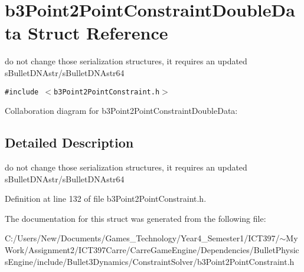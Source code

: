 \hypertarget{structb3_point2_point_constraint_double_data}{
\section{b3Point2PointConstraintDoubleData Struct Reference}
\label{structb3_point2_point_constraint_double_data}
}
do not change those serialization structures, it requires an updated sBulletDNAstr/sBulletDNAstr64  


{\tt \#include $<$b3Point2PointConstraint.h$>$}

Collaboration diagram for b3Point2PointConstraintDoubleData:

\subsection{Detailed Description}
do not change those serialization structures, it requires an updated sBulletDNAstr/sBulletDNAstr64 

Definition at line 132 of file b3Point2PointConstraint.h.

The documentation for this struct was generated from the following file:\begin{CompactItemize}
\item 
C:/Users/New/Documents/Games\_\-Technology/Year4\_\-Semester1/ICT397/$\sim$My Work/Assignment2/ICT397Carre/CarreGameEngine/Dependencies/BulletPhysicsEngine/include/Bullet3Dynamics/ConstraintSolver/b3Point2PointConstraint.h\end{CompactItemize}
